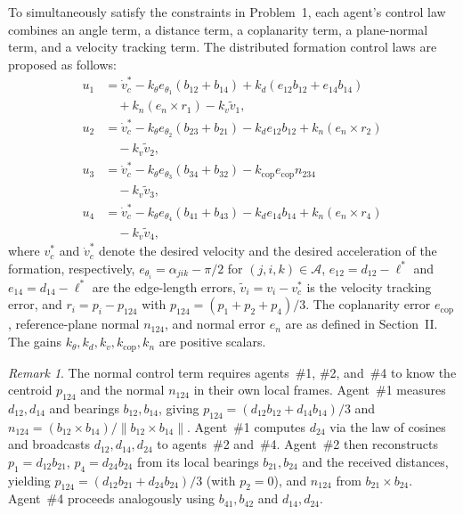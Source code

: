\documentclass[letterpaper,journal]{IEEEtran}
\theoremstyle{plain}
\theoremstyle{definition}
\theoremstyle{remark}
\newtheorem{remark}{Remark}
\begin{document}
To simultaneously satisfy the constraints in Problem~1, each agent's control law combines an angle term, a distance term, a coplanarity term, a plane-normal term, and a velocity tracking term. The distributed formation control laws are proposed as follows:
\begin{equation}
\label{eq:total-control}
\begin{aligned}
u_1&=\dot v_c^*-k_\theta e_{\theta_1}(b_{12}+b_{14})
     +k_d(e_{12}b_{12}+e_{14}b_{14})\\
    &\quad +k_n(e_n\times r_1)-k_v\tilde v_1,\\
u_2&=\dot v_c^*-k_\theta e_{\theta_2}(b_{23}+b_{21})-k_d e_{12}b_{12}
      +k_n(e_n\times r_2)\\
    &\quad -k_v\tilde v_2,\\
u_3&=\dot v_c^*-k_\theta e_{\theta_3}(b_{34}+b_{32})
     -k_{\mathrm{cop}}e_{\mathrm{cop}}n_{234}\\
    &\quad -k_v\tilde v_3,\\[2pt]
u_4&=\dot v_c^*-k_\theta e_{\theta_4}(b_{41}+b_{43})-k_d e_{14}b_{14}
      +k_n(e_n\times r_4)\\
    &\quad -k_v\tilde v_4,
\end{aligned}
\end{equation}
where \(v_c^*\) and \(\dot v_c^*\) denote the desired velocity and the desired acceleration of the formation, respectively, \(e_{\theta_i}=\alpha_{jik}-\pi/2\) for \((j,i,k)\in\mathcal A\), \(e_{12}=d_{12}-\ell^*\) and \(e_{14}=d_{14}-\ell^*\) are the edge-length errors, \(\tilde v_i=v_i-v_c^*\) is the velocity tracking error, and \(r_i=p_i-p_{124}\) with \(p_{124}=(p_1+p_2+p_4)/3\). The coplanarity error \(e_{\mathrm{cop}}\), reference-plane normal \(n_{124}\), and normal error \(e_n\) are as defined in Section~II. The gains \(k_\theta,k_d,k_v,k_{\mathrm{cop}},k_n\) are positive scalars.

\begin{remark}
\label{rem:centroid-computation}
The normal control term requires agents~\#1, \#2, and~\#4 to know the centroid \(p_{124}\) and the normal \(n_{124}\) in their own local frames. Agent~\#1 measures \(d_{12},d_{14}\) and bearings \(b_{12},b_{14}\), giving \(p_{124}=(d_{12}b_{12}+d_{14}b_{14})/3\) and \(n_{124}=(b_{12}\times b_{14})/\|b_{12}\times b_{14}\|\). Agent~\#1 computes \(d_{24}\) via the law of cosines and broadcasts \(d_{12},d_{14},d_{24}\) to agents~\#2 and~\#4. Agent~\#2 then reconstructs \(p_1=d_{12}b_{21}\), \(p_4=d_{24}b_{24}\) from its local bearings \(b_{21},b_{24}\) and the received distances, yielding \(p_{124}=(d_{12}b_{21}+d_{24}b_{24})/3\) (with \(p_2=0\)), and \(n_{124}\) from \(b_{21}\times b_{24}\). Agent~\#4 proceeds analogously using \(b_{41},b_{42}\) and \(d_{14},d_{24}\).
\end{remark}
\end{document}
